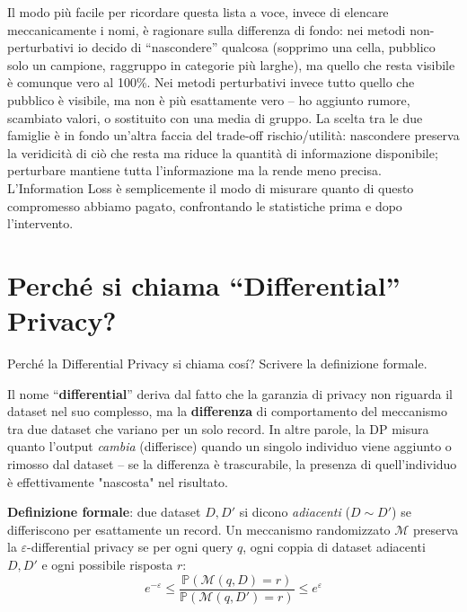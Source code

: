 \documentclass[a4paper,11pt]{article}
\begin{document}
\begin{nota}
Il modo pi\`{u} facile per ricordare questa lista a voce, invece di elencare meccanicamente i nomi, \`{e} ragionare sulla differenza di fondo: nei metodi non-perturbativi io decido di ``nascondere'' qualcosa (sopprimo una cella, pubblico solo un campione, raggruppo in categorie pi\`{u} larghe), ma quello che resta visibile \`{e} comunque vero al 100\%. Nei metodi perturbativi invece tutto quello che pubblico \`{e} visibile, ma non \`{e} pi\`{u} esattamente vero -- ho aggiunto rumore, scambiato valori, o sostituito con una media di gruppo. La scelta tra le due famiglie \`{e} in fondo un'altra faccia del trade-off rischio/utilit\`{a}: nascondere preserva la veridicit\`{a} di ci\`{o} che resta ma riduce la quantit\`{a} di informazione disponibile; perturbare mantiene tutta l'informazione ma la rende meno precisa. L'Information Loss \`{e} semplicemente il modo di misurare quanto di questo compromesso abbiamo pagato, confrontando le statistiche prima e dopo l'intervento.
\end{nota}

\section{Perché si chiama ``Differential'' Privacy?}

\begin{domanda}
Perch\'{e} la Differential Privacy si chiama cos\'{i}? Scrivere la definizione formale.
\end{domanda}

Il nome ``\textbf{differential}'' deriva dal fatto che la garanzia di privacy non riguarda il dataset nel suo complesso, ma la \textbf{differenza} di comportamento del meccanismo tra due dataset che variano per un solo record. In altre parole, la DP misura quanto l'output \emph{cambia} (differisce) quando un singolo individuo viene aggiunto o rimosso dal dataset -- se la differenza \`{e} trascurabile, la presenza di quell'individuo \`{e} effettivamente "nascosta" nel risultato.

\textbf{Definizione formale}: due dataset $D, D'$ si dicono \emph{adiacenti} ($D \sim D'$) se differiscono per esattamente un record. Un meccanismo randomizzato $\mathcal{M}$ preserva la $\varepsilon$-differential privacy se per ogni query $q$, ogni coppia di dataset adiacenti $D, D'$ e ogni possibile risposta $r$:
\[
e^{-\varepsilon} \leq \frac{\mathbb{P}(\mathcal{M}(q, D) = r)}{\mathbb{P}(\mathcal{M}(q, D') = r)} \leq e^{\varepsilon}
\]
\end{document}

